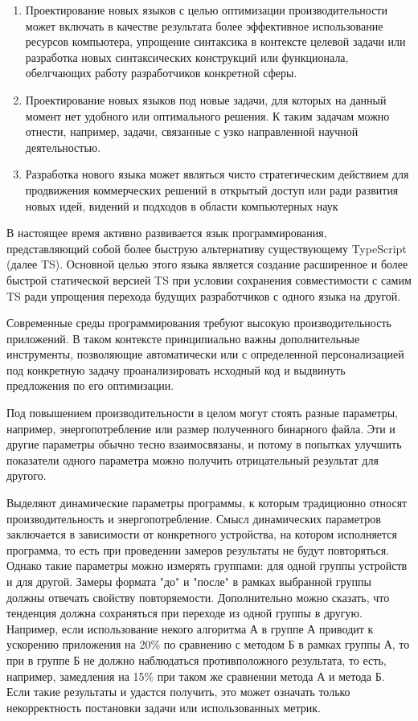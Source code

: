 \documentclass{mipt-thesis-bs}
\begin{document}
\begin{enumerate}
    \item Проектирование новых языков с целью оптимизации производительности
    может включать в качестве результата более эффективное использование
    ресурсов компьютера, упрощение синтаксика в контексте целевой задачи
    или разработка новых синтаксических конструкций или функционала,
    обелгчающих работу разработчиков конкретной сферы.
    \item  Проектирование новых языков под новые задачи, для которых на данный
    момент нет удобного или оптимального решения. К таким задачам можно отнести,
    например, задачи, связанные с узко направленной научной деятельностью.
    \item Разработка нового языка может являться чисто стратегическим действием
    для продвижения коммерческих решений в открытый доступ или ради развития
    новых идей, видений и подходов в области компьютерных наук
\end{enumerate}

В настоящее время активно развивается язык программирования, представляющий собой
более быструю альтернативу существующему TypeScript (далее TS). Основной целью этого языка
является создание расширенное и более быстрой статической версией TS при
условии сохранения совместимости с самим TS ради упрощения перехода будущих разработчиков
с одного языка на другой.

Современные среды программирования требуют высокую производительность приложений. В таком
контексте принципиально важны дополнительные инструменты, позволяющие автоматически или с
определенной персонализацией под конкретную задачу проанализировать исходный код и выдвинуть
предложения по его оптимизации.

Под повышением производительности в целом могут стоять разные параметры, например,
энергопотребление или размер полученного бинарного файла. Эти и другие параметры обычно
тесно взаимосвязаны, и потому в попытках улучшить показатели одного параметра можно получить
отрицательный результат для другого.

Выделяют динамические параметры программы, к которым традиционно относят производительность
и энергопотребление. Смысл динамических параметров заключается в зависимости от конкретного устройства,
на котором исполняется программа, то есть при проведении замеров результаты не будут повторяться.
Однако такие параметры можно измерять группами: для одной группы устройств и для другой.
Замеры формата "до" и "после" в рамках выбранной группы должны отвечать свойству повторяемости.
Дополнительно можно сказать, что тенденция должна сохраняться при переходе из одной группы в другую.
Например, если использование некого алгоритма А в группе А приводит к ускорению приложения на 20\% по
сравнению с методом Б в рамках группы А, то при в группе Б не должно наблюдаться противположного результата,
то есть, например, замедления на 15\% при таком же сравнении метода А и метода Б. Если такие результаты и
удастся получить, это может означать только некорректность постановки задачи или использованных метрик.
\end{document}
